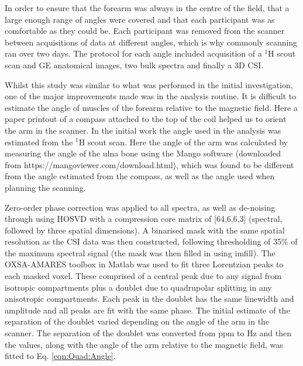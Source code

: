 In order to ensure that the forearm was always in the centre of the field, that a large enough range of angles were covered and that each participant was as comfortable as they could be. Each participant was removed from the scanner between acquisitions of data at different angles, which is why commonly scanning ran over two days. The protocol for each angle included  acquisition of a $^1$H scout scan and \ac{GE} anatomical images, two bulk spectra and finally a 3D \ac{CSI}. 

Whilst this study was similar to what was performed in the initial investigation, one of the major improvements made was in the analysis routine. It is difficult to estimate the angle of muscles of the forearm relative to the magnetic field. Here a paper printout of a compass attached to the top of the coil helped us to orient the arm in the scanner. In the initial work the angle used in the analysis was estimated from the $^1$H scout scan. Here the angle of the arm was calculated by measuring the angle of the ulna bone using the Mango software (downloaded from https://mangoviewer.com/download.html), which was found to be different from the angle estimated from the compass, as well as the angle used when planning the scanning.

Zero-order phase correction was applied to all spectra, as well as de-noising through using \ac{HOSVD} \cite{Bader2007EfficientTensors} with a compression core matrix of [64,6,6,3] (spectral, followed by three spatial dimensions). A binarised mask with the same spatial resolution as the \ac{CSI} data was then constructed, following thresholding of 35\% of the maximum spectral signal (the mask was then filled in using imfill). The OXSA-AMARES \cite{Purvis2017OXSA:MATLAB} toolbox in Matlab was used to fit three Lorentzian peaks to each masked voxel. These comprised of a central peak due to any signal from isotropic compartments plus a doublet due to quadrupolar splitting in any anisotropic compartments. Each peak in the doublet has the same linewidth and amplitude and all peaks are fit with the same phase. The initial estimate of the separation of the doublet varied depending on the angle of the arm in the scanner. The separation of the doublet was converted from ppm to Hz and then the values, along with the angle of the arm relative to the magnetic field, was fitted to Eq. \ref{eqn:Quad:Angle}.

